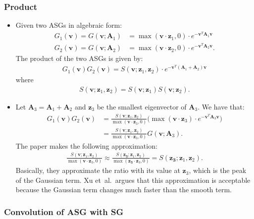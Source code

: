 \documentclass[10pt]{article}
\newcommand{\ve}[1]{\mathbf{#1}}
\newcommand{\etal}{{et~al.}}
\begin{document}
  \subsubsection{Product}

  \begin{itemize}
    \item Given two ASGs in algebraic form:
    \begin{align*}
      G_1(\ve{v}) = G(\ve{v}; \ve{A}_1) &= \max(\ve{v} \cdot \ve{z}_1, 0) \cdot e^{-\ve{v}^T \ve{A}_1 \ve{v}} \\
      G_2(\ve{v}) =  G(\ve{v}; \ve{A}_2) &= \max(\ve{v} \cdot \ve{z}_2, 0) \cdot e^{-\ve{v}^T \ve{A}_2 \ve{v}}.
    \end{align*}
    The product of the two ASGs is given by:
    \begin{align*}
      G_1(\ve{v}) G_2(\ve{v}) = S(\ve{v};\ve{z}_1, \ve{z}_2) \cdot e^{-\ve{v}^T(\ve{A}_1 + \ve{A}_2) \ve{v}}
    \end{align*}
    where
    \begin{align*}
      S(\ve{v}; \ve{z}_1, \ve{z}_2) = S(\ve{v}; \ve{z}_1) S(\ve{v}; \ve{z}_2).
    \end{align*}

    \item Let $\ve{A}_3 = \ve{A}_1 + \ve{A}_2$ and $\ve{z}_3$ be the smallest eigenvector of $\ve{A}_3$.  We have that:
    \begin{align*}
      G_1(\ve{v}) G_2(\ve{v}) 
      &= \frac{S(\ve{v}; \ve{z}_1, \ve{z}_2)}{\max(\ve{v} \cdot \ve{z}_3, 0)} \bigg( \max(\ve{v} \cdot \ve{z}_3) \cdot e^{-\ve{v}^T \ve{A}_3 \ve{v}} \bigg) \\
      &= \frac{S(\ve{v}; \ve{z}_1, \ve{z}_2)}{\max(\ve{v} \cdot \ve{z}_3, 0)} G(\ve{v}; \ve{A}_3).
    \end{align*}
    The paper makes the following approximation:
    \begin{align*}
      \frac{S(\ve{v}; \ve{z}_1, \ve{z}_2)}{\max(\ve{v} \cdot \ve{z}_3, 0)}
      \approx \frac{S(\ve{z_3}; \ve{z}_1, \ve{z}_2)}{\max(\ve{z_3} \cdot \ve{z}_3, 0)}
      =  S(\ve{z_3}; \ve{z}_1, \ve{z}_2).
    \end{align*}
    Basically, they approximate the ratio with its value at $\ve{z}_3$, which is the peak of the Gaussian term.  Xu \etal\ argues that this approximation is acceptable because the Gaussian term changes much faster than the smooth term.
  \end{itemize}

  \subsubsection{Convolution of ASG with SG}
\end{document}
